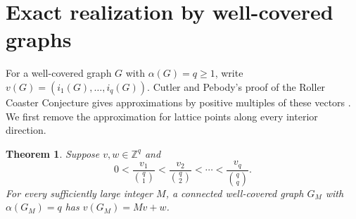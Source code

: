 \documentclass[11pt,a4paper]{article}
\newtheorem{theorem}{Theorem}[section]
\begin{document}
\section{Exact realization by well-covered graphs}
\label{sec:well-covered-factors}

For a well-covered graph $G$ with $\alpha(G)=q\ge1$, write
$v(G)=(i_1(G),\ldots,i_q(G))$. Cutler and Pebody's proof of the Roller
Coaster Conjecture gives approximations by positive multiples of these
vectors \cite[Theorem~3.1]{cutlerpebody}. We first remove the approximation
for lattice points along every interior direction.

\begin{theorem}\label{thm:well-covered-interior}
Suppose $v,w\in\mathbb Z^q$ and
\[
 0<\frac{v_1}{\binom q1}<\frac{v_2}{\binom q2}<\cdots<
 \frac{v_q}{\binom qq}.
\]
For every sufficiently large integer $M$, a connected well-covered graph
$G_M$ with $\alpha(G_M)=q$ has $v(G_M)=Mv+w$.
\end{theorem}
\end{document}
